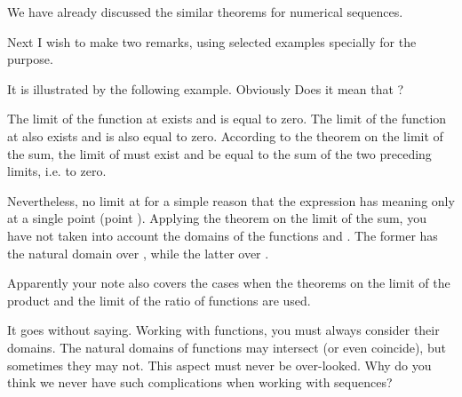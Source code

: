 \begin{s}
We have already discussed the similar theorems for numerical sequences.
\end{s}


\begin{p}
Next I wish to make two remarks, using selected examples specially for the purpose.

\textbf{} It is illustrated by the following example. Obviously
Does it mean that ? 
\end{p}


\begin{s}
The limit of the function  at  exists and is equal to zero. The limit of the function  at  also exists and is also equal to zero. According to the theorem on the limit of the sum, the limit of  must exist and be equal to the sum of the two preceding limits, i.e. to zero.
\end{s}

\begin{p}
Nevertheless,  no limit at  for a simple reason that the expression  has meaning only at a single point (point ). Applying the theorem on the limit of the sum, you have not taken into account the domains of the functions  and . The former has the natural domain over \hlm{$[-1, \,1]$}, while the latter over \hlm{$[1, \infty[$}. 
\end{p}


\begin{s}
Apparently your note also covers the cases when the theorems on the limit of the product and the limit of the ratio of functions are used.
\end{s}

\begin{p}
It goes without saying. Working with functions, you must always consider their domains. The natural domains of functions may intersect (or even coincide), but sometimes they may not. This aspect must never be over-looked. Why do you think we never have such complications when working with sequences?
\end{p}

